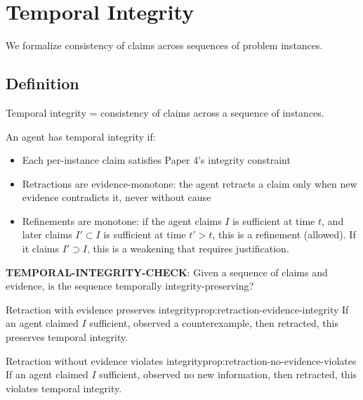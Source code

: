 \section{Temporal Integrity}\label{sec:temporal-integrity}

We formalize consistency of claims across sequences of problem instances.

\subsection{Definition}

\begin{definition}\label{def:temporal-integrity}
Temporal integrity = consistency of claims across a sequence of instances.

An agent has temporal integrity if:
\begin{itemize}
\item Each per-instance claim satisfies Paper 4's integrity constraint
\item Retractions are evidence-monotone: the agent retracts a claim only when new evidence contradicts it, never without cause
\item Refinements are monotone: if the agent claims $I$ is sufficient at time $t$, and later claims $I' \subset I$ is sufficient at time $t' > t$, this is a refinement (allowed). If it claims $I' \supset I$, this is a weakening that requires justification.
\end{itemize}
\end{definition}

\begin{decision}\label{dec:temporal-integrity-check}
\textbf{TEMPORAL-INTEGRITY-CHECK}: Given a sequence of claims and evidence, is the sequence temporally integrity-preserving?
\end{decision}

\begin{claim}{Retraction with evidence preserves integrity}{prop:retraction-evidence-integrity}
If an agent claimed $I$ sufficient, observed a counterexample, then retracted, this preserves temporal integrity.
\end{claim}


\begin{claim}{Retraction without evidence violates integrity}{prop:retraction-no-evidence-violates}
If an agent claimed $I$ sufficient, observed no new information, then retracted, this violates temporal integrity.
\end{claim}

